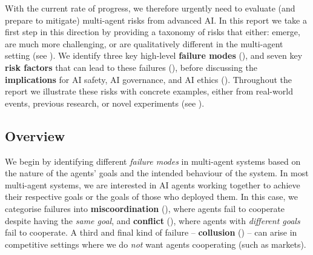 With the current rate of progress, we therefore urgently need to evaluate (and prepare to mitigate) multi-agent risks from advanced AI.
In this report we take a first step in this direction by providing a taxonomy of risks that either: emerge, are much more challenging, or are qualitatively different in the multi-agent setting (see ).
We identify three key high-level \textbf{failure modes} (), and seven key \textbf{risk factors} that can lead to these failures (), before discussing the \textbf{implications} for AI safety, AI governance, and AI ethics ().
Throughout the report we illustrate these risks with concrete examples, either from real-world events, previous research, or novel experiments (see ).

\subsection{Overview}
\label{sec:overview}

We begin by identifying different \emph{failure modes} in multi-agent systems based on the nature of the agents' goals and the intended behaviour of the system.
In most multi-agent systems, we are interested in AI agents working together to achieve their respective goals or the goals of those who deployed them. 
In this case, we categorise failures into \textbf{miscoordination} (), where agents fail to cooperate despite having the \emph{same goal}, and \textbf{conflict} (), where agents with \emph{different goals} fail to cooperate.
A third and final kind of failure -- \textbf{collusion} () -- can arise in competitive settings where we do \emph{not} want agents cooperating (such as markets).

